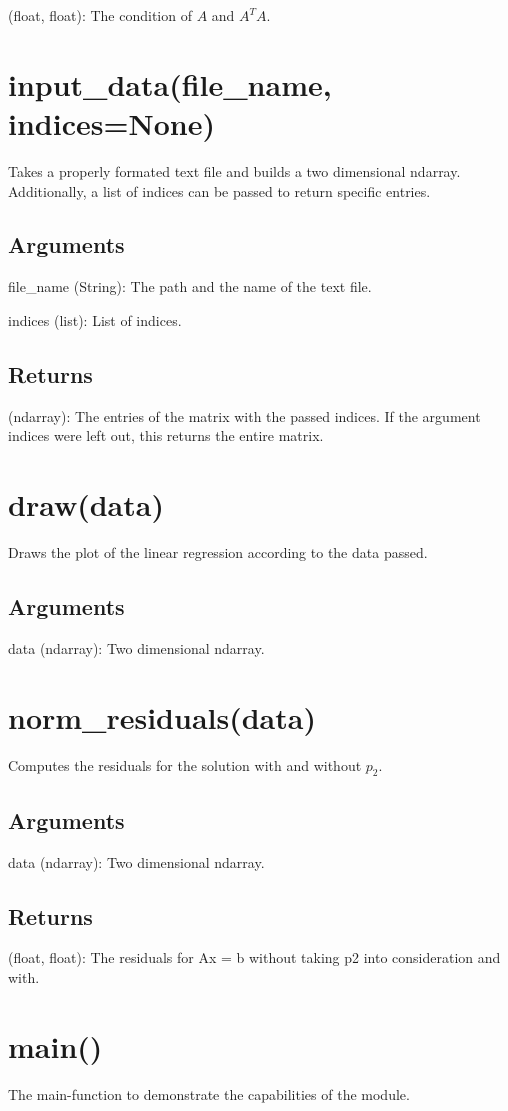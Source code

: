 \documentclass[refman]{article}
\theoremstyle{definition}
\begin{document}
(float, float): The condition of $A$ and $A^T A$.

\section{input\_data(file\_name, indices=None)}

Takes a properly formated text file and builds a two dimensional ndarray. Additionally, a list of indices can be passed to return specific entries.

\subsection*{Arguments}

file\_name (String): The path and the name of the text file.
        
indices (list): List of indices.

\subsection*{Returns}

(ndarray): The entries of the matrix with the passed indices. If the argument indices were left out, this returns the entire matrix.

\section{draw(data)}

Draws the plot of the linear regression according to the data passed.

\subsection*{Arguments}

data (ndarray): Two dimensional ndarray.

\section{norm\_residuals(data)}

    Computes the residuals for the solution with and without $p_2$.

\subsection*{Arguments}

    data (ndarray): Two dimensional ndarray.

\subsection*{Returns}

(float, float): The residuals for Ax = b without taking p2 into consideration and with.

\section{main()}

The main-function to demonstrate the capabilities of the module.
\end{document}
